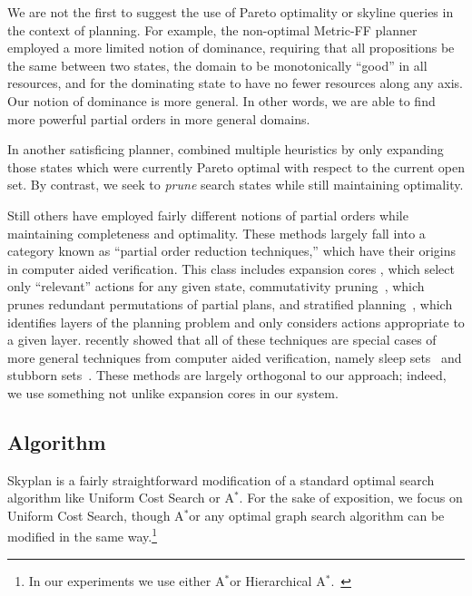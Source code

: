 \documentclass[letterpaper]{article}
\theoremstyle{plain} \newtheorem{theorem}{Theorem} \newtheorem{proposition}{Proposition} \newtheorem{lemma}{Lemma}
\theoremstyle{definition} \newtheorem{definition}{Definition} \newtheorem{conjecture}{Conjecture} \newtheorem*{example}{Example}
\theoremstyle{remark} \newtheorem*{remark}{Remark} \newtheorem*{note}{Note} \newtheorem{case}{Case}
\newcommand{\Astar}{A$^*$}
\begin{document}
We are not the first to suggest the use of Pareto optimality or
skyline queries in the context of planning. For example, the
non-optimal Metric-FF planner~\citep{hoffmann2003metric} employed
a more limited notion of dominance, requiring that all propositions
be the same between two states, the domain to be monotonically
``good'' in all resources, and for the dominating state to have no
fewer resources along any axis. Our notion of dominance is more
general. In other words, we are able to find more powerful partial
orders in more general domains.

In another satisficing planner, \citet{roger2010more} combined
multiple heuristics by only expanding those states which were
currently Pareto optimal with respect to the current open set.  By
contrast, we seek to \textit{prune} search states while still
maintaining optimality.

Still others have employed fairly different notions of partial
orders while maintaining completeness and optimality. These methods
largely fall into a category known as ``partial order reduction
techniques,'' which have their origins in computer aided verification.
This class includes expansion cores \citep{chen09completeness,
xu11theory}, which select only ``relevant'' actions for any given
state, commutativity pruning~\citep{geffner2000admissible}, which
prunes redundant permutations of partial plans, and stratified
planning~\citep{chen2009stratified}, which identifies layers of the
planning problem and only considers actions appropriate to a given
layer. \citet{wehrle2012partial} recently showed that all of these
techniques are special cases of more general techniques from computer
aided verification, namely sleep sets~\citep{godefroid96partial}
and stubborn sets~\citep{valmari92stubborn}. These methods are
largely orthogonal to our approach; indeed, we use something not
unlike expansion cores in our system.


\subsection{Algorithm}

Skyplan is a fairly straightforward modification of a standard
optimal search algorithm like Uniform Cost Search or \Astar. For
the sake of exposition, we focus on Uniform Cost Search, though
\Astar or any optimal graph search algorithm can be modified in the
same way.\footnote{In our experiments we use either \Astar or
Hierarchical \Astar.~\citep{holte1996hierarchical}}
\end{document}
